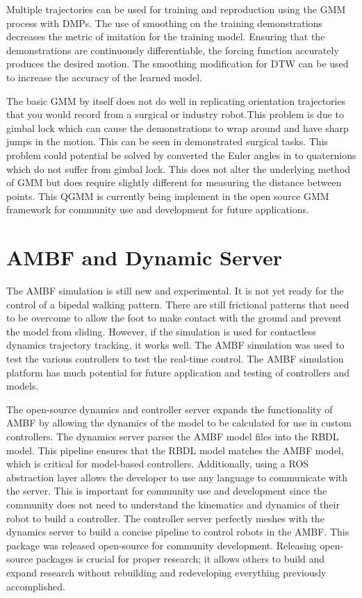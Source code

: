 Multiple trajectories can be used for training and reproduction using the GMM process with DMPs. The use of smoothing on the training demonstrations decreases the metric of imitation for the training model. Ensuring that the demonstrations are continuously differentiable, the forcing function accurately produces the desired motion. The smoothing modification for DTW can be used to increase the accuracy of the learned model. 

The basic GMM by itself does not do well in replicating orientation trajectories that you would record from a surgical or industry robot.This problem is due to gimbal lock which can cause the demonstrations to wrap around and have sharp jumps in the motion. This can be seen in demonstrated surgical tasks. This problem could potential be solved by converted the Euler angles in to quaternions which do not suffer from gimbal lock. This does not alter the underlying method of GMM but does require slightly different for measuring the distance between points. This QGMM is currently being implement in the open source GMM framework for community use and development for future applications. 

\section{AMBF and Dynamic Server}


The AMBF simulation is still new and experimental. It is not yet ready for the control of a bipedal walking pattern. There are still frictional patterns that need to be overcome to allow the foot to make contact with the ground and prevent the model from sliding. However, if the simulation is used for contactless dynamics trajectory tracking, it works well. The AMBF simulation was used to test the various controllers to test the real-time control. The AMBF simulation platform has much potential for future application and testing of controllers and models. 

The open-source dynamics and controller server expands the functionality of AMBF by allowing the dynamics of the model to be calculated for use in custom controllers. The dynamics server parses the AMBF model files into the RBDL model. This pipeline ensures that the RBDL model matches the AMBF model, which is critical for model-based controllers. Additionally, using a ROS abstraction layer allows the developer to use any language to communicate with the server. This is important for community use and development since the community does not need to understand the kinematics and dynamics of their robot to build a controller. The controller server perfectly meshes with the dynamics server to build a concise pipeline to control robots in the AMBF. This package was released open-source for community development. Releasing open-source packages is crucial for proper research; it allows others to build and expand research without rebuilding and redeveloping everything previously accomplished.   


